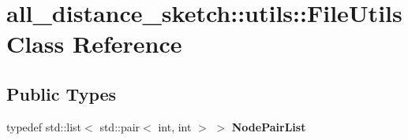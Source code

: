 \hypertarget{classall__distance__sketch_1_1utils_1_1FileUtils}{}\section{all\+\_\+distance\+\_\+sketch\+:\+:utils\+:\+:File\+Utils Class Reference}
\label{classall__distance__sketch_1_1utils_1_1FileUtils}
\subsection*{Public Types}
\begin{DoxyCompactItemize}
\item 
\hypertarget{classall__distance__sketch_1_1utils_1_1FileUtils_ac8150b16762e546ae175645d8981497a}{}typedef std\+::list$<$ std\+::pair$<$ int, int $>$ $>$ {\bfseries Node\+Pair\+List}\label{classall__distance__sketch_1_1utils_1_1FileUtils_ac8150b16762e546ae175645d8981497a}

\end{DoxyCompactItemize}
